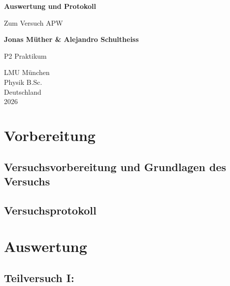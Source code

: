 \documentclass{report}
\begin{document}

\begin{titlepage}
    \begin{center}
        \vspace*{1cm}
            
        \Huge
        \textbf{Auswertung und Protokoll}
            
        \vspace{0.5cm}
        \LARGE
        Zum Versuch APW
        
        \vspace{1.8cm}

        \textbf{Jonas Müther \& Alejandro Schultheiss}
        \vfill
            
        P2 Praktikum\\
       
            
        \vspace{0.8cm}
  

        \vspace{1.8cm}
        \Large
        LMU München \\
        Physik B.Sc.\\
        Deutschland\\
        2026
            
    \end{center}
\end{titlepage}
\tableofcontents

\newpage
\chapter{Vorbereitung}

\section{Versuchsvorbereitung und Grundlagen des Versuchs}


\section{Versuchsprotokoll}


\newpage
\chapter{Auswertung}
\section{Teilversuch I:}
\end{document}
